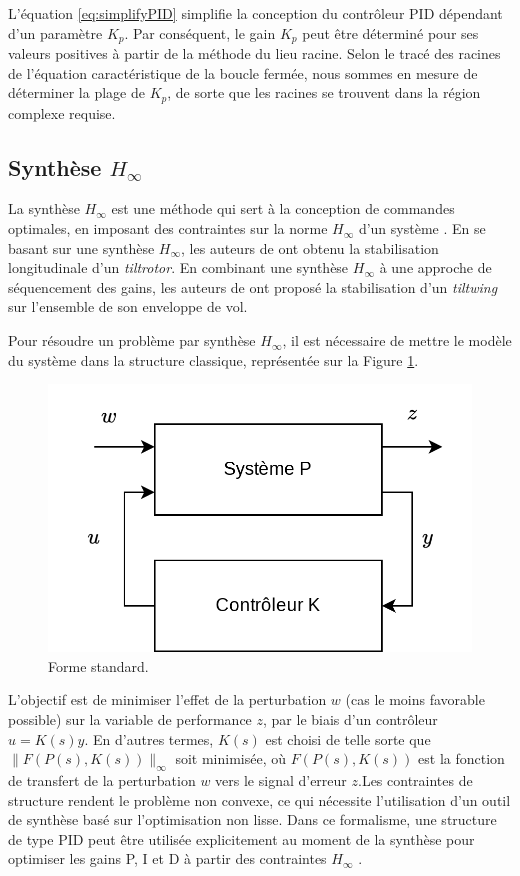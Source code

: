   L'équation \eqref{eq:simplifyPID} simplifie la conception du contrôleur PID dépendant d'un paramètre $K_{p}$. Par conséquent, le gain $K_{p}$ peut être déterminé pour ses valeurs positives à partir de la méthode du lieu racine. Selon le tracé des racines de l'équation caractéristique de la boucle fermée, nous sommes en mesure de déterminer la plage de $K_{p}$, de sorte que les racines se trouvent dans la région complexe requise. 

\subsection*{Synthèse $H_{\infty}$}
La synthèse $H_{\infty}$ est une méthode qui sert à la conception de commandes optimales, en imposant des contraintes sur la norme $H_{\infty}$ d'un système \cite{DGKF89}. En se basant sur une synthèse $H_{\infty}$, les auteurs de \cite{SunYang2009} ont obtenu la stabilisation longitudinale d'un \textit{tiltrotor}. En combinant une synthèse $H_{\infty}$ à une approche de séquencement des gains, les auteurs de \cite{DickesonMix2005, DickesonCifdaloz2006,DickesonMiles2007} ont proposé la stabilisation d'un \textit{tiltwing} sur l'ensemble de son enveloppe de vol.

Pour résoudre un problème par synthèse $H_{\infty}$, il est nécessaire de mettre le modèle du système dans la structure classique, représentée sur la Figure \ref{fig:schemalft}. 

\begin{figure}[ht!]
    \centerline{
    \includegraphics[trim=0cm 0cm 0cm 0cm,clip,width=0.5\columnwidth]{figures/lft.png}}
    \caption{Forme standard.}
    \label{fig:schemalft}
\end{figure}

L'objectif est de minimiser l'effet de la perturbation $w$  (cas le moins favorable possible) sur la variable de performance $z$, par le biais d'un contrôleur $u = K(s) y$. En d'autres termes, $K(s)$ est choisi de telle sorte que $\| F(P(s), K(s))\|_{\infty}$  soit minimisée, où $F(P(s), K(s))$ est la fonction de transfert de la perturbation $w$ vers le signal d'erreur $z$.Les contraintes de structure rendent le problème non convexe, ce qui nécessite l'utilisation d'un outil de synthèse basé sur l'optimisation non lisse. Dans ce formalisme, une structure de type PID peut être utilisée explicitement au moment de la synthèse pour optimiser les gains P, I et D à partir des contraintes $H_{\infty}$ \cite{1576856,ApkarianMulti}.

